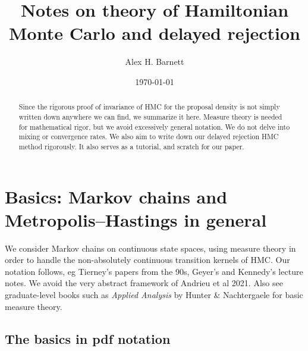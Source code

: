 \documentclass[10pt]{article}
\begin{document}
\title{Notes on theory of Hamiltonian Monte Carlo and delayed rejection}


\author{Alex H. Barnett}
\date{\today}
\maketitle

\begin{abstract}
  Since the rigorous proof of invariance of HMC for the proposal density
  is not simply written
  down anywhere we can find, we summarize it here.
  Measure theory is needed for mathematical rigor, but we avoid
  excessively general notation.
  We do not delve into mixing or convergence rates.
  We also aim to write down our delayed rejection HMC method rigorously.
  It also serves as a tutorial,
  and scratch for our paper.
\end{abstract}



\section{Basics: Markov chains and Metropolis--Hastings in general}

We consider Markov chains on continuous
state spaces, using measure theory in order to handle the non-absolutely
continuous transition kernels of HMC.
Our notation follows, eg Tierney's papers from the 90s, Geyer's and Kennedy's lecture notes.
We avoid the very abstract framework of Andrieu et al 2021.
Also see graduate-level books such as {\em Applied Analysis} by Hunter \& Nachtergaele for basic measure theory.

\subsection{The basics in pdf notation}
\end{document}
